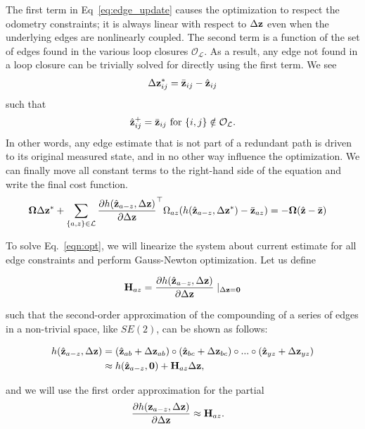 The first term in Eq~\ref{eq:edge_update} causes the optimization to respect the odometry constraints; it is always linear with respect to $\Delta\mathbf{z}$ even when the underlying edges are nonlinearly coupled. The second term is a function of the set of edges found in the various loop closures $\mathcal{O_L}$. As a result, any edge not found in a loop closure can be trivially solved for directly using the first term. We see
\begin{align*}
  \Delta\mathbf{z}_{ij}^* = \bar{\mathbf{z}}_{ij} -\hat{\mathbf{z}}_{ij}
  \end{align*}
  such that
  \begin{align*}
  \hat{\mathbf{z}}_{ij}^+ = \bar{\mathbf{z}}_{ij}  \text{ for } \{i,j\} \notin \mathcal{O_L}.
\end{align*}
In other words, any edge estimate that is not part of a redundant path is driven to its original measured state, and in no other way influence the optimization. We can finally move all constant terms to the right-hand side of the equation and write the final cost function.
\begin{align}
  \boldsymbol{\Omega} \Delta\mathbf{z}^*  + \sum_{\{a,z\} \in \mathcal{L}}
  \frac{\partial h(\hat{\mathbf{z}}_{a-z},\Delta\mathbf{z})}{\partial \Delta\mathbf{z}}^\top
  \Omega_{az}(h(\hat{\mathbf{z}}_{a-z},\Delta\mathbf{z}^*)-\bar{\mathbf{z}}_{az})
  &= -\boldsymbol{\Omega}(\hat{\mathbf{z}} -\bar{\mathbf{z}})
  \label{eqn:opt}
\end{align}

To solve Eq.~\ref{eqn:opt}, we will linearize the system about current estimate for all edge constraints and perform Gauss-Newton optimization.  Let us define

\begin{align*}
  \mathbf{H}_{az} = \frac{\partial h(\hat{\mathbf{z}}_{a-z},\Delta\mathbf{z})}{\partial \Delta\mathbf{z}} \mid_{\Delta\mathbf{z} = \mathbf{0}}
\end{align*}

such that the second-order approximation of the compounding of a series of edges in a non-trivial space, like $SE(2)$, can be shown as follows:

\begin{align*}
  h(\hat{\mathbf{z}}_{a-z},\Delta\mathbf{z}) &= (\hat{\mathbf{z}}_{ab} + \Delta\mathbf{z}_{ab}) \circ (\hat{\mathbf{z}}_{bc} + \Delta\mathbf{z}_{bc}) \circ ... \circ (\hat{\mathbf{z}}_{yz} + \Delta\mathbf{z}_{yz})\\
   &\approx
  h(\hat{\mathbf{z}}_{a-z},\mathbf{0}) + \mathbf{H}_{az} \Delta\mathbf{z},
\end{align*}

and we will use the first order approximation for the partial
\begin{align*}
  \frac{\partial h(\mathbf{z}_{a-z},\Delta\mathbf{z})}{\partial \Delta\mathbf{z}} &\approx \mathbf{H}_{az}.
\end{align*}

